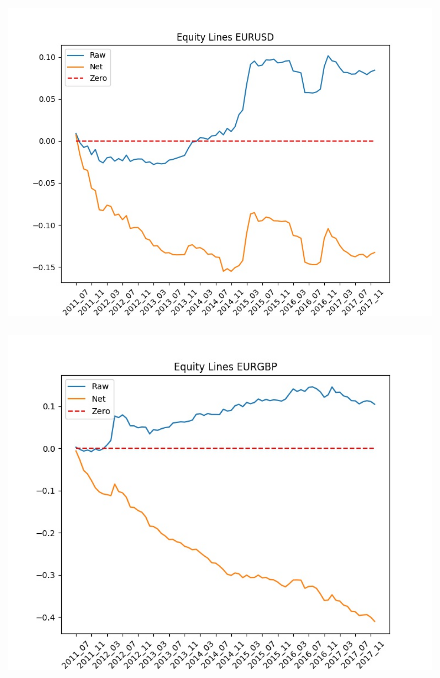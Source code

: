 \documentclass[a4paper]{article}
\begin{document}
\begin{figure}
	\centering
	\begin{minipage}{.5\textwidth}
		\centering
		\includegraphics[width=\linewidth]{Figures/EURUSD.jpeg}
		\label{fig:11}
	\end{minipage}%
	\begin{minipage}{.5\textwidth}
		\centering
		\includegraphics[width=\linewidth]{Figures/EURGBP.jpeg}
		\label{fig:12}
	\end{minipage}
	\begin{minipage}{.5\textwidth}
		\centering

\end{minipage}
\end{figure}
\end{document}
